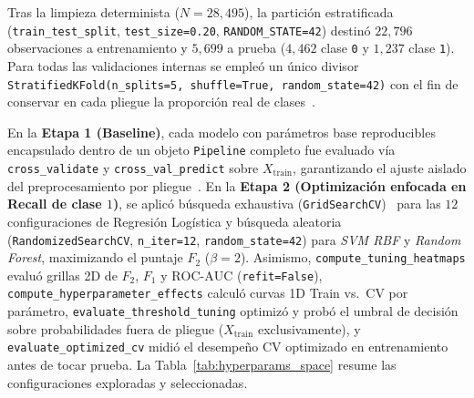 \documentclass[conference]{IEEEtran}
\begin{document}
Tras la limpieza determinista ($N=28{,}495$), la partición estratificada (\texttt{train\_test\_split}, \texttt{test\_size=0.20}, \texttt{RANDOM\_STATE=42}) destinó $22{,}796$ observaciones a entrenamiento y $5{,}699$ a prueba ($4{,}462$ clase \texttt{0} y $1{,}237$ clase \texttt{1}). Para todas las validaciones internas se empleó un único divisor \texttt{StratifiedKFold(n\_splits=5, shuffle=True, random\_state=42)} con el fin de conservar en cada pliegue la proporción real de clases~\cite{muller2016introduction}.

En la \textbf{Etapa 1 (Baseline)}, cada modelo con parámetros base reproducibles encapsulado dentro de un objeto \texttt{Pipeline} completo fue evaluado vía \texttt{cross\_validate} y \texttt{cross\_val\_predict} sobre $X_{\text{train}}$, garantizando el ajuste aislado del preprocesamiento por pliegue~\cite{muller2016introduction}. En la \textbf{Etapa 2 (Optimización enfocada en Recall de clase $1$)}, se aplicó búsqueda exhaustiva (\texttt{GridSearchCV})~\cite{muller2016introduction} para las $12$ configuraciones de Regresión Logística y búsqueda aleatoria~\cite{bergstra2012random} (\texttt{RandomizedSearchCV}, \texttt{n\_iter=12}, \texttt{random\_state=42}) para \textit{SVM RBF} y \textit{Random Forest}, maximizando el puntaje $F_2$ ($\beta=2$). Asimismo, \texttt{compute\_tuning\_heatmaps} evaluó grillas 2D de $F_2$, $F_1$ y $\text{ROC-AUC}$ (\texttt{refit=False}), \texttt{compute\_hyperparameter\_effects} calculó curvas 1D Train vs.\ CV por parámetro, \texttt{evaluate\_threshold\_tuning} optimizó y probó el umbral de decisión sobre probabilidades fuera de pliegue ($X_{\text{train}}$ exclusivamente), y \texttt{evaluate\_optimized\_cv} midió el desempeño CV optimizado en entrenamiento antes de tocar prueba. La Tabla~\ref{tab:hyperparams_space} resume las configuraciones exploradas y seleccionadas.
\end{document}

